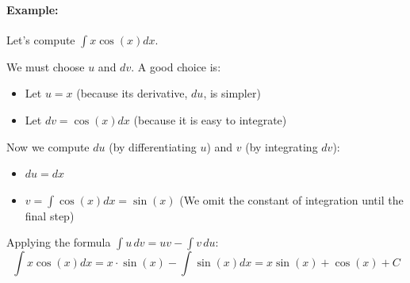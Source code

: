 \documentclass[oneside]{book}
\begin{document}
\paragraph*{Example:}
Let's compute $\int x \cos(x) dx$.

We must choose $u$ and $dv$. A good choice is:
\begin{itemize}
    \item Let $u = x$ (because its derivative, $du$, is simpler)
    \item Let $dv = \cos(x) dx$ (because it is easy to integrate)
\end{itemize}
Now we compute $du$ (by differentiating $u$) and $v$ (by integrating $dv$):
\begin{itemize}
    \item $du = dx$
    \item $v = \int \cos(x) dx = \sin(x)$ (We omit the constant of integration until the final step)
\end{itemize}
Applying the formula $\int u \, dv = uv - \int v \, du$:
\[
\int x \cos(x) dx = x \cdot \sin(x) - \int \sin(x) dx = x\sin(x) + \cos(x) + C
\]
\end{document}
